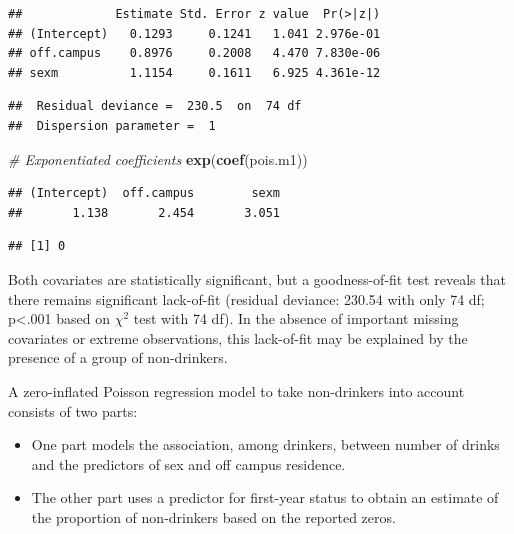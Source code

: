 \documentclass[
]{krantz}
\newenvironment{Shaded}{\begin{snugshade}}{\end{snugshade}}
\newcommand{\CommentTok}[1]{\textcolor[rgb]{0.37,0.37,0.37}{\textit{#1}}}
\newcommand{\DecValTok}[1]{\textcolor[rgb]{0.06,0.06,0.06}{#1}}
\newcommand{\KeywordTok}[1]{\textcolor[rgb]{0.27,0.27,0.27}{\textbf{#1}}}
\newcommand{\NormalTok}[1]{#1}
\newcommand{\OperatorTok}[1]{\textcolor[rgb]{0.43,0.43,0.43}{\textbf{#1}}}
\newcommand{\StringTok}[1]{\textcolor[rgb]{0.5,0.5,0.5}{#1}}
\providecommand{\tightlist}{%
  \setlength{\itemsep}{0pt}\setlength{\parskip}{0pt}}
\begin{document}
\begin{verbatim}
##             Estimate Std. Error z value  Pr(>|z|)
## (Intercept)   0.1293     0.1241   1.041 2.976e-01
## off.campus    0.8976     0.2008   4.470 7.830e-06
## sexm          1.1154     0.1611   6.925 4.361e-12
\end{verbatim}

\begin{verbatim}
##  Residual deviance =  230.5  on  74 df 
##  Dispersion parameter =  1
\end{verbatim}

\begin{Shaded}
\begin{Highlighting}[]
\CommentTok{# Exponentiated coefficients}
\KeywordTok{exp}\NormalTok{(}\KeywordTok{coef}\NormalTok{(pois.m1))}
\end{Highlighting}
\end{Shaded}

\begin{verbatim}
## (Intercept)  off.campus        sexm 
##       1.138       2.454       3.051
\end{verbatim}

\begin{Shaded}
\end{Shaded}

\begin{verbatim}
## [1] 0
\end{verbatim}

Both covariates are statistically significant, but a goodness-of-fit test reveals that there remains significant lack-of-fit (residual deviance: 230.54 with only 74 df; p\textless.001 based on \(\chi^2\) test with 74 df). In the absence of important missing covariates or extreme observations, this lack-of-fit may be explained by the presence of a group of non-drinkers.

A zero-inflated Poisson regression model to take non-drinkers into account consists of two parts:

\begin{itemize}
\tightlist
\item
  One part models the association, among drinkers, between number of drinks and the predictors of sex and off campus residence.
\item
  The other part uses a predictor for first-year status to obtain an estimate of the proportion of non-drinkers based on the reported zeros.
\end{itemize}
\end{document}
